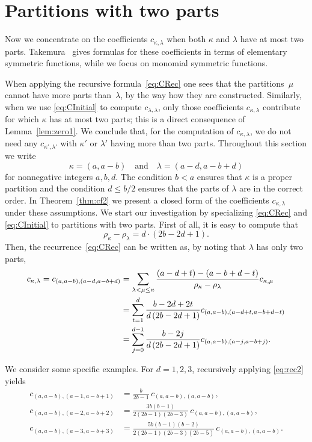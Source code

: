 \documentclass[smallextended]{svjour3}
\begin{document}
\section{Partitions with two parts}\label{sec:2parts}

Now we concentrate on the coefficients $c_{\kappa,\lambda}$ when both $\kappa$
and $\lambda$ have at most two parts. Takemura~\cite[\S~4.4]{Takemura}
gives formulas for these coefficients in terms of elementary symmetric
functions, while we focus on monomial symmetric functions.

When applying the recursive formula~\eqref{eq:CRec} one sees that the
partitions~$\mu$ cannot have more parts than~$\lambda$, by the way how they
are constructed. Similarly, when we use \eqref{eq:CInitial} to compute
$c_{\lambda,\lambda}$, only those coefficients $c_{\kappa,\lambda}$ contribute
for which $\kappa$ has at most two parts; this is a direct consequence of
Lemma~\ref{lem:zero1}.  We conclude that, for the computation of
$c_{\kappa,\lambda}$, we do not need any $c_{\kappa',\lambda'}$ with $\kappa'$
or $\lambda'$ having more than two parts.  Throughout this section we write
\[
  \kappa=(a,a-b) \quad\text{and}\quad \lambda=(a-d,a-b+d)
\]
for nonnegative integers $a,b,d$.  The condition $b<a$ ensures that $\kappa$
is a proper partition and the condition $d\leq b/2$ ensures that the
parts of $\lambda$ are in the correct order. In Theorem~\ref{thm:cf2} we
present a closed form of the coefficients $c_{\kappa,\lambda}$ under these
assumptions. We start our investigation by specializing
 \eqref{eq:CRec} and \eqref{eq:CInitial} to partitions with two
parts. First of all, it is easy to compute that 
\[
  \rho_{\kappa}-\rho_{\lambda} = d\cdot(2b-2d+1).
\]
Then, the recurrence~\eqref{eq:CRec} can be written as, by noting that
$\lambda$ has only two parts,
\begin{align}\label{eq:rec2}
  c_{\kappa,\lambda} = c_{(a,a-b),(a-d,a-b+d)} &=
  \sum_{\lambda<\mu\leq\kappa}\frac{(a-d+t)-(a-b+d-t)}{\rho_{\kappa}-\rho_{\lambda}} c_{\kappa,\mu} \\
  &= \sum_{t=1}^d\frac{b-2d+2t}{d\,(2b-2d+1)}c_{(a,a-b),(a-d+t,a-b+d-t)} \notag \\ 
  & = \sum_{j=0}^{d-1} \frac{b-2j}{d\,(2b-2d+1)}c_{(a,a-b),(a-j,a-b+j)}. \notag
\end{align}

\begin{example}\label{ex:twoparts}
We consider some specific examples.  For $d=1,2,3$, recursively applying \eqref{eq:rec2} yields
\allowdisplaybreaks
\begin{align*}
  c_{(a,a-b),(a-1,a-b+1)} &=
    \frac{b}{2b-1}\,c_{(a,a-b),(a,a-b)}, \\
  c_{(a,a-b),(a-2,a-b+2)} &=
\frac{3b(b-1)}{2(2b-1)(2b-3)}\,c_{(a,a-b),(a,a-b)}, \\
  c_{(a,a-b),(a-3,a-b+3)} &=
\frac{5b(b-1)(b-2)}{2(2b-1)(2b-3)(2b-5)}\,c_{(a,a-b),(a,a-b)}.
\end{align*}
\end{example}
\end{document}

